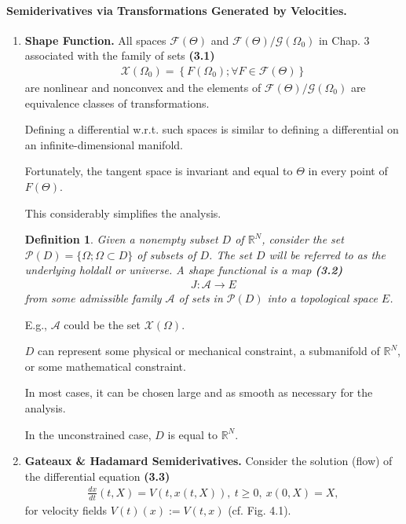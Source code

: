 \documentclass{book}
\numberwithin{equation}{section}
\newtheorem{definition}{Definition}[section]
\begin{document}
\paragraph{Semiderivatives via Transformations Generated by Velocities.}
\begin{enumerate}
    \item \textbf{Shape Function.} All spaces $\mathcal{F}(\Theta)$ and $\mathcal{F}(\Theta)/\mathcal{G}(\Omega_0)$ in Chap. 3 associated with the family of sets \textbf{(3.1)}
    \begin{align*}
        \mathcal{X}\left(\Omega_0\right) = \left\{F\left(\Omega_0\right);\forall F\in\mathcal{F}(\Theta)\right\}
    \end{align*}
    are nonlinear and nonconvex and the elements of $\mathcal{F}(\Theta)/\mathcal{G}(\Omega_0)$ are equivalence classes of transformations.
    
    Defining a differential w.r.t. such spaces is similar to defining a differential on an infinite-dimensional manifold.
    
    Fortunately, the tangent space is invariant and equal to $\Theta$ in every point of $F(\Theta)$.
    
    This considerably simplifies the analysis.
    
    \begin{definition}
        Given a nonempty subset $D$ of $\mathbb{R}^N$, consider the set $\mathcal{P}(D) = \{\Omega;\Omega\subset D\}$ of subsets of $D$. The set $D$ will be referred to as the underlying \emph{holdall} or \emph{universe}. A \emph{shape functional} is a map \textbf{(3.2)}
        \begin{align*}
            J:\mathcal{A}\to E
        \end{align*}
        from some \emph{admissible family} $\mathcal{A}$ of sets in $\mathcal{P}(D)$ into a topological space $E$.
    \end{definition}
    E.g., $\mathcal{A}$ could be the set $\mathcal{X}(\Omega)$.
    
    $D$ can represent some physical or mechanical constraint, a submanifold of $\mathbb{R}^N$, or some mathematical constraint.
    
    In most cases, it can be chosen large and as smooth as necessary for the analysis.
    
    In the unconstrained case, $D$ is equal to $\mathbb{R}^N$.
    \item \textbf{Gateaux \& Hadamard Semiderivatives.} Consider the solution (flow) of the differential equation \textbf{(3.3)}
    \begin{align*}
        \frac{dx}{dt}(t,X) = V\left(t,x(t,X)\right),\ t\ge 0,\ x(0,X) = X,
    \end{align*}
    for velocity fields $V(t)(x) := V(t,x)$ (cf. Fig. 4.1).
    

\end{enumerate}
\end{document}
